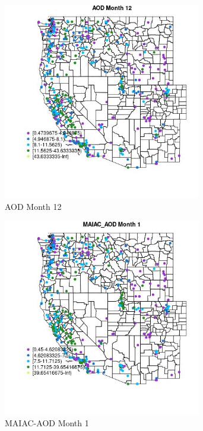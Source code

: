 \begin{figure} 
\centering  
\includegraphics[width=0.77\textwidth]{Code_Outputs/ML_input_report_ML_input_PM25_Step5_part_d_de_duplicated_aves_ML_input_MapObsMo12AOD.jpg} 
\caption{\label{fig:ML_input_report_ML_input_PM25_Step5_part_d_de_duplicated_aves_ML_inputMapObsMo12AOD}AOD Month 12} 
\end{figure} 
 

\begin{figure} 
\centering  
\includegraphics[width=0.77\textwidth]{Code_Outputs/ML_input_report_ML_input_PM25_Step5_part_d_de_duplicated_aves_ML_input_MapObsMo1MAIAC_AOD.jpg} 
\caption{\label{fig:ML_input_report_ML_input_PM25_Step5_part_d_de_duplicated_aves_ML_inputMapObsMo1MAIAC_AOD}MAIAC-AOD Month 1} 
\end{figure} 
 

